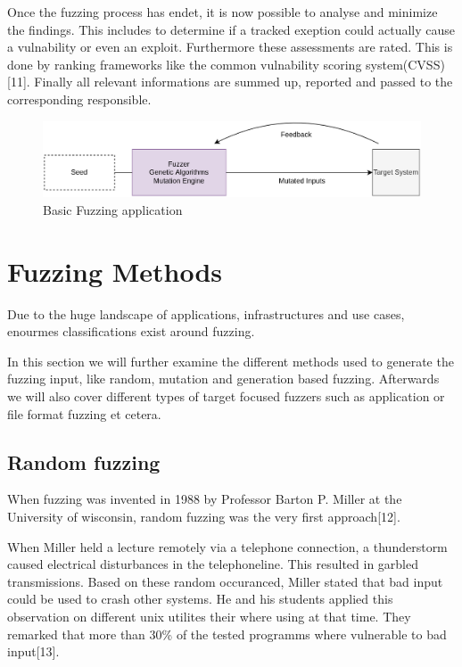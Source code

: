 \documentclass[journal=tosc,final]{iacrtrans}
\begin{document}
Once the fuzzing process has endet, it is now possible to analyse and minimize the findings. This includes to determine if a tracked exeption could actually cause a vulnability or even an exploit. Furthermore these assessments are rated. This is done by ranking frameworks like the common vulnability scoring system(CVSS)[11]. Finally all relevant informations are summed up, reported and passed to the corresponding responsible. 
\begin{figure}
\caption{Basic Fuzzing application}
 \begin{shaded}

\begin{center}
\includegraphics[scale=0.2]{../final2.png}
\end{center}
\end{shaded}

\end{figure}

\section{Fuzzing Methods}
Due to the huge landscape of applications, infrastructures and use cases, enourmes classifications exist around fuzzing. 

In this section we will further examine the different methods used to generate the fuzzing input, like random, mutation and generation based fuzzing. Afterwards we will also cover different types of target focused fuzzers such as application or file format fuzzing et cetera. 
\subsection{Random fuzzing}
When fuzzing was invented in 1988 by Professor Barton P. Miller at the University of wisconsin, random fuzzing was the very first approach[12].

When Miller held a lecture remotely via a telephone connection, a thunderstorm caused electrical disturbances in the telephoneline. This resulted in garbled transmissions. Based on these random occuranced, Miller stated that bad input  could be used to crash other systems. He and his students applied this observation on different unix utilites their where using at that time. They remarked that  more than 30\% of the tested programms where vulnerable to bad input[13]. 
\end{document}
